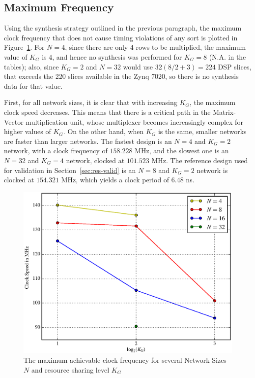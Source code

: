 \subsection{Maximum Frequency}\label{sec:res-synth-maxfreq}
Using the synthesis strategy outlined in the previous paragraph, the maximum clock frequency that does not cause timing violations of any sort is plotted in
Figure~\ref{fig:maxfreq}. For $N=4$, since there are only 4 rows to be multiplied, the maximum value of $K_G$ is 4, and hence no synthesis was performed for $K_G = 8$ (N.A. in the tables);
also, since $K_G = 2$ and $N=32$ would use $32(8/2+3) = 224$ DSP slices, that exceeds the 220 slices available in the Zynq 7020, so there is no synthesis data for that value.

First, for all network sizes, it is clear that with increasing $K_G$, the maximum clock speed decreases. This means that there is a critical path in the Matrix-Vector multiplication unit,
whose multiplexer becomes increasingly complex for higher values of $K_G$. On the other hand, when $K_G$ is the same, smaller networks are faster than larger networks. The fastest design
is an $N=4$ and $K_G = 2$ network, with a clock frequency of $158.228$ MHz, and the slowest one is an $N=32$ and $K_G=4$ network, clocked at $101.523$ MHz. The reference design used for
validation in Section~\ref{sec:res-valid} is an $N=8$ and $K_G=2$ network is clocked at $154.321$ MHz, which yields a clock period of $6.48$ ns.

\begin{figure}
    \centering
    \includegraphics[width=\linewidth]{figures/maxfreq.eps}
    \caption[The maximum achievable clock frequency for several Network Sizes $N$ and resource sharing level $K_G$]{The maximum achievable clock frequency for several Network Sizes $N$ and resource sharing level $K_G$}
    \label{fig:maxfreq}
\end{figure}


